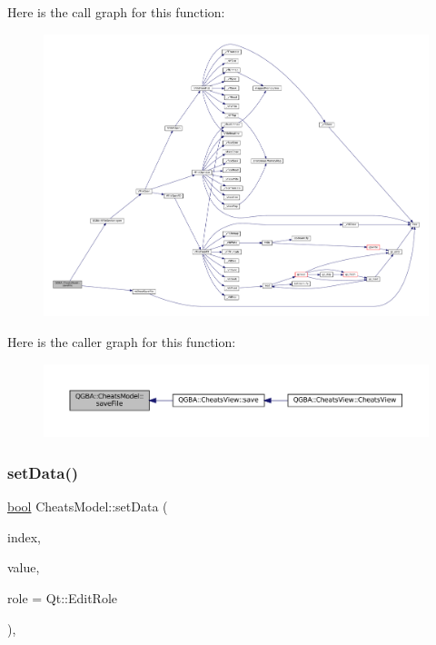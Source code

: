 Here is the call graph for this function\+:
\nopagebreak
\begin{figure}[H]
\begin{center}
\leavevmode
\includegraphics[width=350pt]{class_q_g_b_a_1_1_cheats_model_a13d9efacd0bee0a791167365c2a9b7ba_cgraph}
\end{center}
\end{figure}
Here is the caller graph for this function\+:
\nopagebreak
\begin{figure}[H]
\begin{center}
\leavevmode
\includegraphics[width=350pt]{class_q_g_b_a_1_1_cheats_model_a13d9efacd0bee0a791167365c2a9b7ba_icgraph}
\end{center}
\end{figure}
\mbox{\label{class_q_g_b_a_1_1_cheats_model_ad74f11015ce75f58c3b89fd12811d6aa}} 
\subsubsection{\texorpdfstring{set\+Data()}{setData()}}
{\footnotesize\ttfamily \mbox{\hyperlink{libretro_8h_a4a26dcae73fb7e1528214a068aca317e}{bool}} Cheats\+Model\+::set\+Data (\begin{DoxyParamCaption}\item[{const Q\+Model\+Index \&}]{index,  }\item[{const Q\+Variant \&}]{value,  }\item[{\mbox{\hyperlink{ioapi_8h_a787fa3cf048117ba7123753c1e74fcd6}{int}}}]{role = {\ttfamily Qt\+:\+:EditRole} }\end{DoxyParamCaption})\hspace{0.3cm}{\ttfamily [override]}, {\ttfamily [virtual]}}

